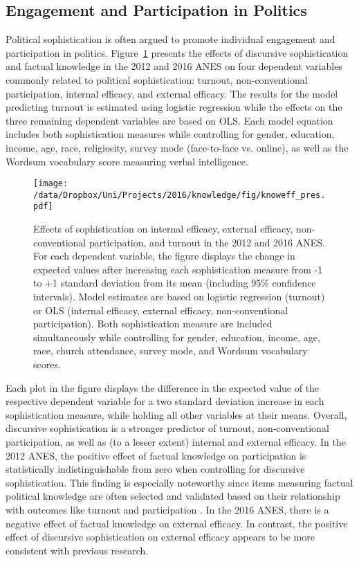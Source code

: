\subsection{Engagement and Participation in Politics}
Political sophistication is often argued to promote individual engagement and participation in politics. Figure~\ref{fig:knoweff} presents the effects of discursive sophistication and factual knowledge in the 2012 and 2016 ANES on four dependent variables commonly related to political sophistication: turnout, non-conventional participation, internal efficacy, and external efficacy. The results for the model predicting turnout is estimated using logistic regression while the effects on the three remaining dependent variables are based on OLS. Each model equation includes both sophistication measures while controlling for gender, education, income, age, race, religiosity, survey mode (face-to-face vs. online), as well as the Wordsum vocabulary score measuring verbal intelligence.

\begin{figure}[h]\centering
\texttt{[image: /data/Dropbox/Uni/Projects/2016/knowledge/fig/knoweff\_pres.pdf]}
\caption[Effects of sophistication on internal efficacy, external efficacy, non-conventional participation, and turnout in the 2012 and 2016 ANES]{Effects of sophistication on internal efficacy, external efficacy, non-conventional participation, and turnout in the 2012 and 2016 ANES. For each dependent variable, the figure displays the change in expected values after increasing each sophistication measure from -1 to +1 standard deviation from its mean (including 95\% confidence intervals). Model estimates are based on logistic regression (turnout) or OLS (internal efficacy, external efficacy, non-conventional participation). Both sophistication measure are included simultaneously while controlling for gender, education, income, age, race, church attendance, survey mode, and Wordsum vocabulary scores.
}\label{fig:knoweff}
\end{figure}

Each plot in the figure displays the difference in the expected value of the respective dependent variable for a two standard deviation increase in each sophistication measure, while holding all other variables at their means. Overall, discursive sophistication is a stronger predictor of turnout, non-conventional participation, as well as (to a lesser extent) internal and external efficacy. In the 2012 ANES, the positive effect of factual knowledge on participation is statistically indistinguishable from zero when controlling for discursive sophistication. This finding is especially noteworthy since items measuring factual political knowledge are often selected and validated based on their relationship with outcomes like turnout and participation \citep[c.f.,][]{lupia2015uninformed}. In the 2016 ANES, there is a negative effect of factual knowledge on external efficacy. In contrast, the positive effect of discursive sophistication on external efficacy appears to be more consistent with previous research.



